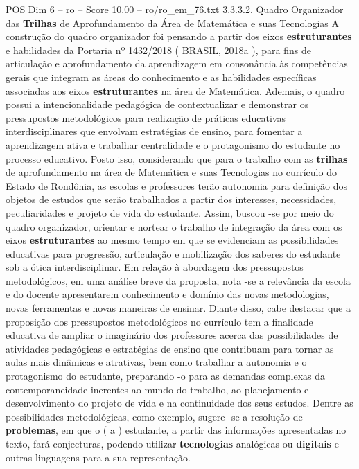\begin{textsample}{POS Dim 6 – ro – Score 10.00 – ro/ro\_em\_76.txt}  \label{ex:f6_pos_138}
3.3.3.2.
Quadro Organizador das \textbf{Trilhas} de Aprofundamento da Área de Matemática e suas Tecnologias A construção do quadro organizador foi pensando a partir dos eixos \textbf{estruturantes} e habilidades da Portaria nº 1432/2018 ( BRASIL, 2018a ), para fins de articulação e aprofundamento da aprendizagem em consonância às competências gerais que integram as áreas do conhecimento e as habilidades específicas associadas aos eixos \textbf{estruturantes} na área de Matemática.
Ademais, o quadro possui a intencionalidade pedagógica de contextualizar e demonstrar os pressupostos metodológicos para realização de práticas educativas interdisciplinares que envolvam estratégias de ensino, para fomentar a aprendizagem ativa e trabalhar centralidade e o protagonismo do estudante no processo educativo.
Posto isso, considerando que para o trabalho com as \textbf{trilhas} de aprofundamento na área de Matemática e suas Tecnologias no currículo do Estado de Rondônia, as escolas e professores terão autonomia para definição dos objetos de estudos que serão trabalhados a partir dos interesses, necessidades, peculiaridades e projeto de vida do estudante.
Assim, buscou -se por meio do quadro organizador, orientar e nortear o trabalho de integração da área com os eixos \textbf{estruturantes} ao mesmo tempo em que se evidenciam as possibilidades educativas para progressão, articulação e mobilização dos saberes do estudante sob a ótica interdisciplinar.
Em relação à abordagem dos pressupostos metodológicos, em uma análise breve da proposta, nota -se a relevância da escola e do docente apresentarem conhecimento e domínio das novas metodologias, novas ferramentas e novas maneiras de ensinar.
Diante disso, cabe destacar que a proposição dos pressupostos metodológicos no currículo tem a finalidade educativa de ampliar o imaginário dos professores acerca das possibilidades de atividades pedagógicas e estratégias de ensino que contribuam para tornar as aulas mais dinâmicas e atrativas, bem como trabalhar a autonomia e o protagonismo do estudante, preparando -o para as demandas complexas da contemporaneidade inerentes ao mundo do trabalho, ao planejamento e desenvolvimento do projeto de vida e na continuidade dos seus estudos.
Dentre as possibilidades metodológicas, como exemplo, sugere -se a resolução de \textbf{problemas}, em que o ( a ) estudante, a partir das informações apresentadas no texto, fará conjecturas, podendo utilizar \textbf{tecnologias} analógicas ou \textbf{digitais} e outras linguagens para a sua representação.

\end{textsample}

